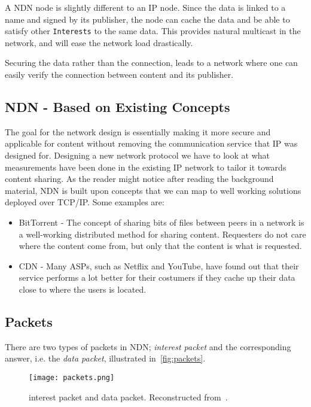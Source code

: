A \gls{NDN} node is slightly different to an \gls{IP} node. 
Since the \gls{data} is linked to a \gls{name} and signed by its \gls{publisher}, the node can cache the \gls{data} and be able to satisfy other \texttt{Interests} to the same \gls{data}. 
This provides natural \gls{multicast} in the network, and will ease the network load drastically.

Securing the \gls{data} rather than the connection, leads to a network where one can easily verify the connection between content and its \gls{publisher}.

\subsection{NDN - Based on Existing Concepts}
The goal for the network design is essentially making it more secure and applicable for content without removing the communication service that \gls{IP} was designed for. 
Designing a new network protocol we have to look at what measurements have been done in the existing \gls{IP} network to tailor it towards content sharing.
As the reader might notice after reading the background material, \gls{NDN} is built upon concepts that we can map to well working solutions deployed over \gls{TCP}/\gls{IP}.
Some examples are:
\begin{itemize}
  \item BitTorrent - 
  The concept of sharing bits of files between peers in a network is a well-working distributed method for sharing content. 
  Requesters do not care where the content come from, but only that the content is what is requested.
  \item \gls{CDN} - 
  Many \gls{ASPs}, such as Netflix and YouTube, have found out that their service performs a lot better for their costumers if they cache up their data close to where the users is located.
\end{itemize}

\subsection{Packets}\label{packets}
There are two types of packets in \gls{NDN};
\textit{\gls{interest} packet} and the corresponding answer, i.e. the \textit{\gls{data} packet}, illustrated in~\autoref{fig:packets}.

\begin{figure}[H]
  \centering
  \texttt{[image: packets.png]}
  \caption[NDN packets]{\gls{interest} packet and \gls{data} packet.
  Reconstructed from~\cite{jac09-03}.
  }
  \label{fig:packets}
\end{figure}

